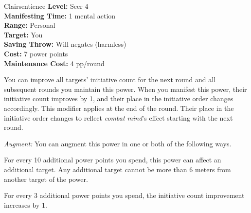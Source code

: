 {Clairsentience}
{
	\textbf{Level:}
	Seer 4\\
	\textbf{Manifesting Time:}
	1 mental action\\
	\textbf{Range:}
	Personal\\
	\textbf{Target:}
	You\\
	\textbf{Saving Throw:}
	Will negates (harmless)\\
	\textbf{Cost:}
	7 power points\\
	\textbf{Maintenance Cost:}
	4 pp/round\\
}
{
	You can improve all targets' initiative count for the next round and all subsequent rounds you maintain this power. When you manifest this power, their initiative count improves by 1, and their place in the initiative order changes accordingly. This modifier applies at the end of the round. Their place in the initiative order changes to reflect \emph{combat mind}'s effect starting with the next round.

	\textit{Augment:} You can augment this power in one or both of the following ways.
	\begin{enumerate*}
		\item For every 10 additional power points you spend, this power can affect an additional target. Any additional target cannot be more than 6 meters from another target of the power.
		\item For every 3 additional power points you spend, the initiative count improvement increases by 1.
	\end{enumerate*}
}